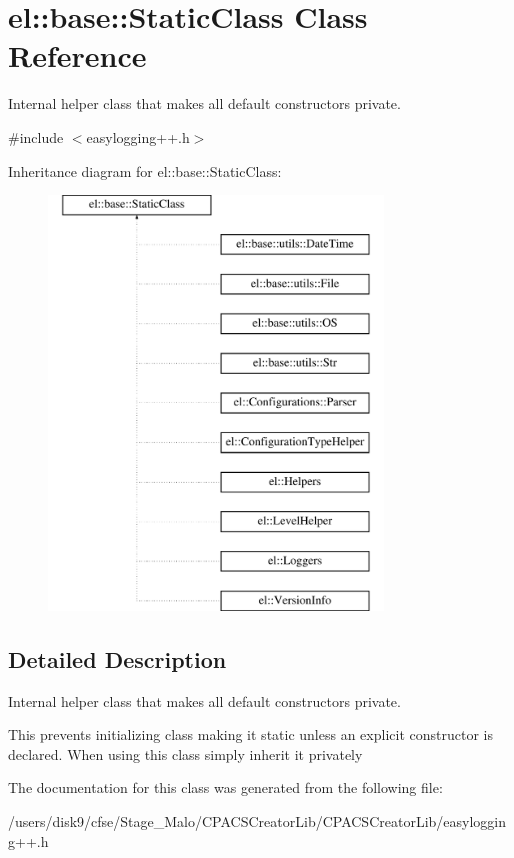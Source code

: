 \hypertarget{classel_1_1base_1_1StaticClass}{\section{el\-:\-:base\-:\-:Static\-Class Class Reference}
\label{classel_1_1base_1_1StaticClass}
}


Internal helper class that makes all default constructors private.  




{\ttfamily \#include $<$easylogging++.\-h$>$}

Inheritance diagram for el\-:\-:base\-:\-:Static\-Class\-:\begin{figure}[H]
\begin{center}
\leavevmode
\includegraphics[height=11.000000cm]{classel_1_1base_1_1StaticClass}
\end{center}
\end{figure}


\subsection{Detailed Description}
Internal helper class that makes all default constructors private. 

This prevents initializing class making it static unless an explicit constructor is declared. When using this class simply inherit it privately 

The documentation for this class was generated from the following file\-:\begin{DoxyCompactItemize}
\item 
/users/disk9/cfse/\-Stage\-\_\-\-Malo/\-C\-P\-A\-C\-S\-Creator\-Lib/\-C\-P\-A\-C\-S\-Creator\-Lib/easylogging++.\-h\end{DoxyCompactItemize}
